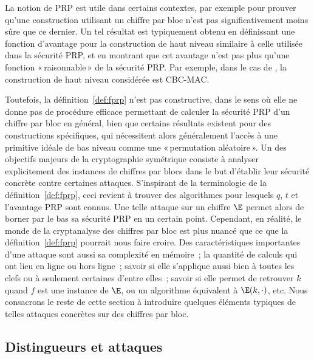 \medskip


La notion de PRP est utile dans certains contextes, par exemple pour prouver qu'une construction utilisant un chiffre par bloc n'est pas significativement moins
sûre que ce dernier. Un tel résultat est typiquement obtenu en définissant une fonction d'avantage pour la construction de haut niveau
similaire à celle utilisée dans la sécurité PRP, et en montrant
que cet avantage n'est pas plus qu'une fonction «\,raisonnable\,» de la sécurité PRP.
Par exemple, dans le cas de \cite{DBLP:journals/jcss/BellareKR00}, la construction de haut niveau considérée est CBC-MAC.

Toutefois, la définition~\ref{def:fprp} n'est pas constructive, dans le sens où elle ne donne pas de procédure efficace permettant de calculer la sécurité PRP
d'un chiffre par bloc en général, bien que certains résultats existent pour des constructions spécifiques, qui nécessitent alors généralement l'accès à une
primitive idéale de bas niveau comme une «\,permutation aléatoire\,».
Un des objectifs majeurs de la cryptographie symétrique consiste à analyser explicitement des instances de chiffres par blocs dans le but d'établir leur sécurité
concrète contre certaines attaques. S'inspirant de la terminologie de la définition~\ref{def:fprp}, ceci revient à trouver
des algorithmes pour lesquels $q$, $t$ et l'avantage PRP sont connus. Une telle attaque sur un chiffre $\E$ permet alors de borner par le bas sa sécurité PRP
en un certain point.
Cependant, en réalité, le monde de la cryptanalyse des chiffres par bloc est plus nuancé que ce que la définition~\ref{def:fprp} pourrait nous faire croire.
Des caractéristiques importantes d'une attaque sont aussi sa complexité en mémoire~; la quantité de calculs qui ont lieu en ligne ou hors ligne~; savoir si elle s'applique
aussi bien à toutes les clefs ou à seulement certaines d'entre elles~; savoir si elle permet de retrouver $k$ quand $f$ est une instance de $\E$, ou un algorithme
équivalent à $\E(k,\cdot)$, etc.
Nous consacrons le reste de cette section à introduire quelques éléments typiques de telles attaques concrètes sur des chiffres par bloc.

\subsection{Distingueurs et attaques}

